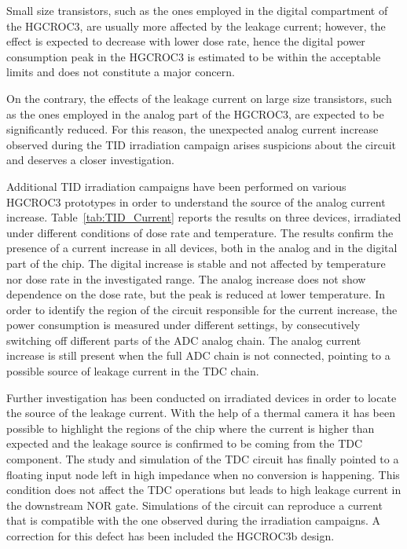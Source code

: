 Small size transistors, such as the ones employed in the digital compartment of the HGCROC3, are usually more affected by the leakage current; however, the effect is expected to decrease with lower dose rate, hence the digital power consumption peak in the HGCROC3 is estimated to be within the acceptable limits and does not constitute a major concern.

On the contrary, the effects of the leakage current on large size transistors, such as the ones employed in the analog part of the HGCROC3, are expected to be significantly reduced. For this reason, the unexpected analog current increase observed during the TID irradiation campaign arises suspicions about the circuit and deserves a closer investigation.

\bigbreak

Additional TID irradiation campaigns have been performed on various HGCROC3 prototypes in order to understand the source of the analog current increase. 
Table~\ref{tab:TID_Current} reports the results on three devices, irradiated under different conditions of dose rate and temperature.
The results confirm the presence of a current increase in all devices, both in the analog and in the digital part of the chip. The digital increase is stable and not affected by temperature nor dose rate in the investigated range. The analog increase does not show dependence on the dose rate, but the peak is reduced at lower temperature.
In order to identify the region of the circuit responsible for the current increase, the power consumption is measured under different settings, by consecutively switching off different parts of the ADC analog chain. The analog current increase is still present when the full ADC chain is not connected, pointing to a possible source of leakage current in the TDC chain.

\bigbreak

Further investigation has been conducted on irradiated devices in order to locate the source of the leakage current. With the help of a thermal camera it has been possible to highlight the regions of the chip where the current is higher than expected and the leakage source is confirmed to be coming from the TDC component.
The study and simulation of the TDC circuit has finally pointed to a floating input node left in high impedance when no conversion is happening.
This  condition does not affect the TDC operations but leads to high leakage current in the downstream NOR gate. Simulations of the circuit can reproduce a current that is compatible with the one observed during the irradiation campaigns.
A correction for this defect has been included the HGCROC3b design.

